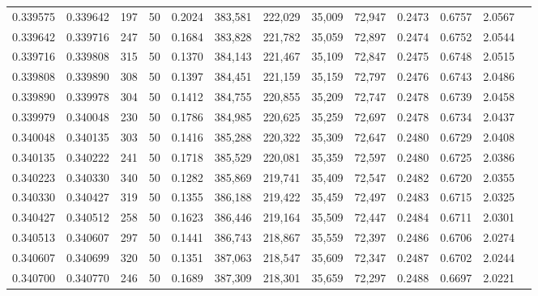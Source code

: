 \begin{tabular}{rrrrrrrrrrrrr}
0.339575 & 0.339642 &   197 &  50 &                                     0.2024 & 383,581 & 222,029 &  35,009 &  72,947 & 0.2473 & 0.6757 & 2.0567 \\
0.339642 & 0.339716 &   247 &  50 &                                     0.1684 & 383,828 & 221,782 &  35,059 &  72,897 & 0.2474 & 0.6752 & 2.0544 \\
0.339716 & 0.339808 &   315 &  50 &                                     0.1370 & 384,143 & 221,467 &  35,109 &  72,847 & 0.2475 & 0.6748 & 2.0515 \\
0.339808 & 0.339890 &   308 &  50 &                                     0.1397 & 384,451 & 221,159 &  35,159 &  72,797 & 0.2476 & 0.6743 & 2.0486 \\
0.339890 & 0.339978 &   304 &  50 &                                     0.1412 & 384,755 & 220,855 &  35,209 &  72,747 & 0.2478 & 0.6739 & 2.0458 \\
0.339979 & 0.340048 &   230 &  50 &                                     0.1786 & 384,985 & 220,625 &  35,259 &  72,697 & 0.2478 & 0.6734 & 2.0437 \\
0.340048 & 0.340135 &   303 &  50 &                                     0.1416 & 385,288 & 220,322 &  35,309 &  72,647 & 0.2480 & 0.6729 & 2.0408 \\
0.340135 & 0.340222 &   241 &  50 &                                     0.1718 & 385,529 & 220,081 &  35,359 &  72,597 & 0.2480 & 0.6725 & 2.0386 \\
0.340223 & 0.340330 &   340 &  50 &                                     0.1282 & 385,869 & 219,741 &  35,409 &  72,547 & 0.2482 & 0.6720 & 2.0355 \\
0.340330 & 0.340427 &   319 &  50 &                                     0.1355 & 386,188 & 219,422 &  35,459 &  72,497 & 0.2483 & 0.6715 & 2.0325 \\
0.340427 & 0.340512 &   258 &  50 &                                     0.1623 & 386,446 & 219,164 &  35,509 &  72,447 & 0.2484 & 0.6711 & 2.0301 \\
0.340513 & 0.340607 &   297 &  50 &                                     0.1441 & 386,743 & 218,867 &  35,559 &  72,397 & 0.2486 & 0.6706 & 2.0274 \\
0.340607 & 0.340699 &   320 &  50 &                                     0.1351 & 387,063 & 218,547 &  35,609 &  72,347 & 0.2487 & 0.6702 & 2.0244 \\
0.340700 & 0.340770 &   246 &  50 &                                     0.1689 & 387,309 & 218,301 &  35,659 &  72,297 & 0.2488 & 0.6697 & 2.0221 \\

\end{tabular}
